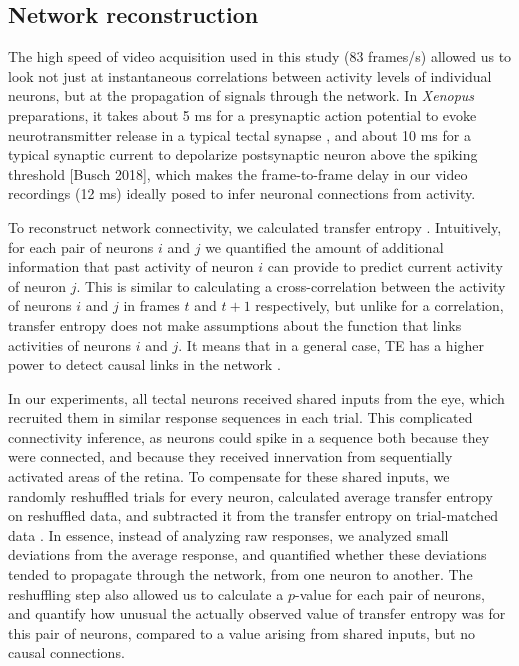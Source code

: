 \documentclass{article}
\begin{document}
\subsection*{Network reconstruction}

The high speed of video acquisition used in this study (83 frames/s) allowed us to look not just at instantaneous correlations between activity levels of individual neurons, but at the propagation of signals through the network. In \textit{Xenopus} preparations, it takes about 5 ms for a presynaptic action potential to evoke neurotransmitter release in a typical tectal synapse \citep{khakhalin2012}, and about 10 ms for a typical synaptic current to depolarize postsynaptic neuron above the spiking threshold \citep{ciarleglio2015}[Busch 2018], which makes the frame-to-frame delay in our video recordings (12 ms) ideally posed to infer neuronal connections from activity.

To reconstruct network connectivity, we calculated transfer entropy \citep{gourevitch2007te,stetter2012te}. Intuitively, for each pair of neurons $i$ and $j$ we quantified the amount of additional information that past activity of neuron $i$ can provide to predict current activity of neuron $j$. This is similar to calculating a cross-correlation between the activity of neurons $i$ and $j$ in frames $t$ and $t+1$ respectively, but unlike for a correlation, transfer entropy does not make assumptions about the function that links activities of neurons $i$ and $j$. It means that in a general case, TE has a higher power to detect causal links in the network \citep{stetter2012te}.

In our experiments, all tectal neurons received shared inputs from the eye, which recruited them in similar response sequences in each trial. This complicated connectivity inference, as neurons could spike in a sequence both because they were connected, and because they received innervation from sequentially activated areas of the retina. To compensate for these shared inputs, we randomly reshuffled trials for every neuron, calculated average transfer entropy on reshuffled data, and subtracted it from the transfer entropy on trial-matched data \citep{gourevitch2007te,wollstadt2014te}. In essence, instead of analyzing raw responses, we analyzed small deviations from the average response, and quantified whether these deviations tended to propagate through the network, from one neuron to another. The reshuffling step also allowed us to calculate a $p$-value for each pair of neurons, and quantify how unusual the actually observed value of transfer entropy was for this pair of neurons, compared to a value arising from shared inputs, but no causal connections.
\end{document}
